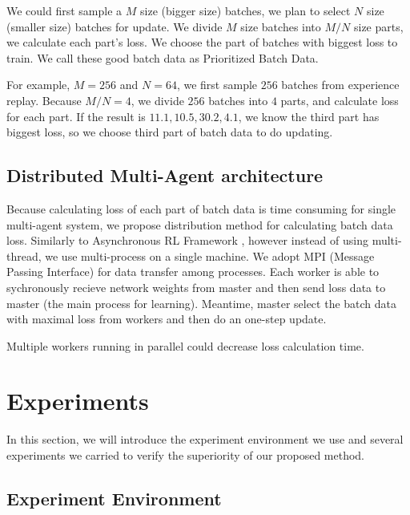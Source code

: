 \documentclass[11pt,twocolumn]{jarticle} %
\begin{document}
We could first sample a $M$ size (bigger size) batches, we plan to select $N$ size (smaller size) batches for update. We divide $M$ size batches into $M/N$ size parts, we calculate each part's loss. We choose the part of batches with biggest loss to train. We call these good batch data as Prioritized Batch Data. \par

For example, $M = 256$ and $N = 64$, we first sample $256$ batches from experience replay. Because $M / N = 4$, we divide $256$ batches into $4$ parts, and calculate loss for each part. If the result is {$11.1, 10.5, 30.2, 4.1$}, we know the third part has biggest loss, so we choose third part of batch data to do updating. 


\subsection{Distributed Multi-Agent architecture}

Because calculating loss of each part of batch data is time consuming for single multi-agent system, we propose distribution method for calculating batch data loss. Similarly to Asynchronous RL Framework \cite{a3c}, however instead of using multi-thread, we use multi-process on a single machine. We adopt MPI (Message Passing Interface) for data transfer among processes. Each worker is able to sychronously recieve network weights from master and then send loss data to master (the main process for learning). Meantime, master select the batch data with maximal loss from workers and then do an one-step update. \par

Multiple workers running in parallel could decrease loss calculation time. \par


\section{Experiments}
In this section, we will introduce the experiment environment we use and several experiments we carried to verify the superiority of our proposed method.

\subsection{Experiment Environment}
\end{document}
